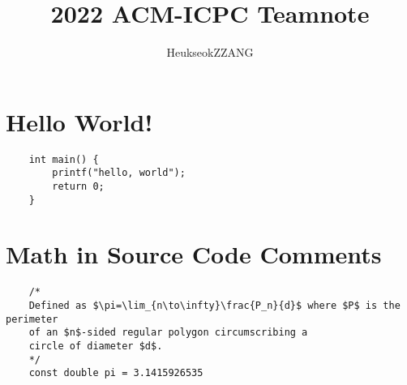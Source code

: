 \documentclass{article}
\begin{document}
	
\title{2022 ACM-ICPC Teamnote}
\author{HeukseokZZANG}
\maketitle

\lipsum

\section{Hello World!}
\begin{verbatim}
	int main() {
		printf("hello, world");
		return 0;
	}
\end{verbatim}

\section{Math in Source Code Comments}
\begin{verbatim}
	/*
	Defined as $\pi=\lim_{n\to\infty}\frac{P_n}{d}$ where $P$ is the perimeter
	of an $n$-sided regular polygon circumscribing a
	circle of diameter $d$.
	*/
	const double pi = 3.1415926535
\end{verbatim}
	
\end{document}
